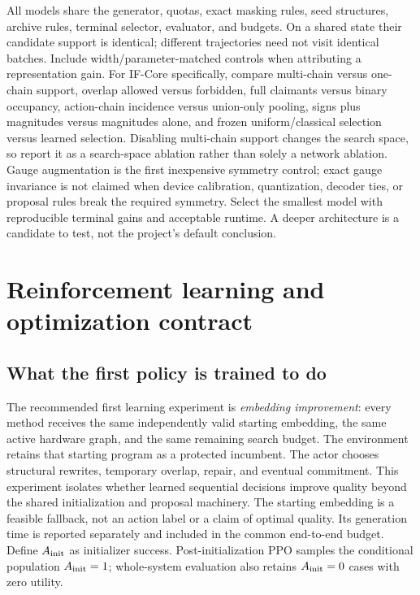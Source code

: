 \documentclass[11pt,a4paper]{article}
\theoremstyle{definition}\newtheorem{definition}[proposition]{Definition}
\begin{document}
All models share the generator, quotas, exact masking rules, seed structures, archive rules, terminal selector, evaluator, and budgets. On a shared state their candidate support is identical; different trajectories need not visit identical batches. Include width/parameter-matched controls when attributing a representation gain. For IF-Core specifically, compare multi-chain versus one-chain support, overlap allowed versus forbidden, full claimants versus binary occupancy, action-chain incidence versus union-only pooling, signs plus magnitudes versus magnitudes alone, and frozen uniform/classical selection versus learned selection. Disabling multi-chain support changes the search space, so report it as a search-space ablation rather than solely a network ablation. Gauge augmentation is the first inexpensive symmetry control; exact gauge invariance is not claimed when device calibration, quantization, decoder ties, or proposal rules break the required symmetry. Select the smallest model with reproducible terminal gains and acceptable runtime. A deeper architecture is a candidate to test, not the project's default conclusion.
 \section{Reinforcement learning and optimization contract}
\label{sec:rl-training}

\subsection{What the first policy is trained to do}

The recommended first learning experiment is \emph{embedding improvement}: every method receives
the same independently valid starting embedding, the same active hardware graph, and the same
remaining search budget. The environment retains that starting program as a protected incumbent.
The actor chooses structural rewrites, temporary overlap, repair, and eventual commitment. This
experiment isolates whether learned sequential decisions improve quality beyond the shared
initialization and proposal machinery. The starting embedding is a feasible fallback, not an action
label or a claim of optimal quality. Its generation time is reported separately and included in the common end-to-end budget. Define $A_{\rm init}$ as initializer success. Post-initialization PPO samples the conditional population $A_{\rm init}=1$; whole-system evaluation also retains $A_{\rm init}=0$ cases with zero utility.
\end{document}
